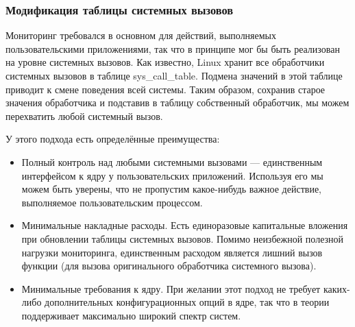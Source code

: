 \documentclass[a4paper,14pt]{extarticle}
\begin{document}
 	\subsubsection{Модификация таблицы системных вызовов}
 	
 	Мониторинг требовался в основном для действий, выполняемых пользовательскими приложениями, так что в принципе мог бы быть реализован на уровне системных вызовов. Как известно, Linux хранит все обработчики системных вызовов в таблице sys\_call\_table. Подмена значений в этой таблице приводит к смене поведения всей системы. Таким образом, сохранив старое значения обработчика и подставив в таблицу собственный обработчик, мы можем перехватить любой системный вызов.
 	
 	У этого подхода есть определённые преимущества:
 	\begin{itemize}
 		\item Полный контроль над любыми системными вызовами — единственным интерфейсом к ядру у пользовательских приложений. Используя его мы можем быть уверены, что не пропустим какое-нибудь важное действие, выполняемое пользовательским процессом.
 		\item Минимальные накладные расходы. Есть единоразовые капитальные вложения при обновлении таблицы системных вызовов. Помимо неизбежной полезной нагрузки мониторинга, единственным расходом является лишний вызов функции (для вызова оригинального обработчика системного вызова).
 		\item Минимальные требования к ядру. При желании этот подход не требует каких-либо дополнительных конфигурационных опций в ядре, так что в теории поддерживает максимально широкий спектр систем.
 	\end{itemize}
 	
\end{document}
